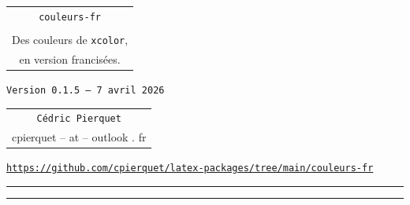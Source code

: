 \documentclass[french,11pt,a4paper]{article}
\def\TPversion{0.1.5}
\def\TPdate{7 avril 2026}
\begin{document}
\pagestyle{fancy}

\thispagestyle{empty}

\begin{center}
	\begin{minipage}{0.75\linewidth}
	\begin{tcolorbox}[colframe=yellow,colback=yellow!15]
		\begin{center}
			\begin{tabular}{c}
				{\Huge \texttt{couleurs-fr}}\\
				\\
				{\LARGE Des couleurs de \texttt{xcolor},} \\
				{\LARGE en version francisées.} \\
			\end{tabular}

			\medskip

			{\small \texttt{Version \TPversion{} -- \TPdate}}
		\end{center}
	\end{tcolorbox}
\end{minipage}
\end{center}

\begin{center}
	\begin{tabular}{c}
	\texttt{Cédric Pierquet}\\
	{\ttfamily cpierquet -- at -- outlook . fr}
\end{tabular}
\end{center}

\begin{center}
\begin{minipage}{0.85\linewidth}
	\begin{tcolorbox}[colframe=teal,colback=teal!10,halign=center,fontupper=\footnotesize]
		\texttt{\url{https://github.com/cpierquet/latex-packages/tree/main/couleurs-fr}}
	\end{tcolorbox}
\end{minipage}
\end{center}

\hrule


\hypertarget{matoc}{}

\tableofcontents

\vspace*{5mm}

\hrule

\vspace*{5mm}
\end{document}
